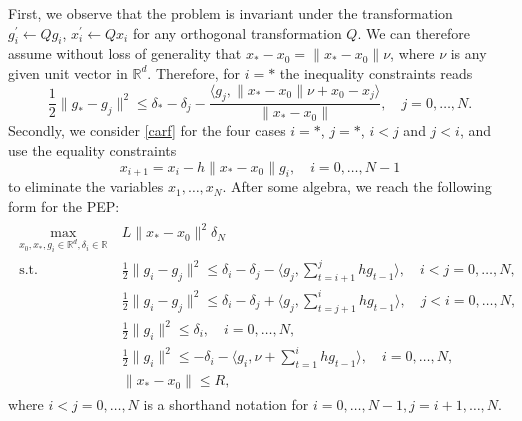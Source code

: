 \documentclass[12pt]{article}
\numberwithin{equation}{section}
\theoremstyle{definition}
\theoremstyle{remark}
\begin{document}
First, we observe that the problem is invariant under the transformation $g_i^\prime
\leftarrow Q g_i$, $x_i^\prime \leftarrow Q x_i$ for any orthogonal transformation $Q$. We can
therefore assume without loss of generality that $x_\ast- x_0= \|x_\ast-x_0\|\nu$, where $\nu$
is any given unit vector in $\mathbb{R}^d$. Therefore, for $i=\ast$ the inequality constraints
reads
\[
    \frac{1}{2}\| g_\ast - g_j \| ^2 \leq \delta_\ast - \delta_j - \frac{ \langle g_j, \|x_\ast-x_0\|\nu+x_0-x_j \rangle}{\|x_\ast-x_0\|},\quad     j=0,\dots,N.
\]
Secondly,
we consider \eqref{carf} for the four cases $i=\ast$, $j=\ast$, $i<j$ and $j<i$,
and use the equality constraints
$$
x_{i+1} = x_i - h \|x_\ast-x_0\| g_i,\quad i=0,\dots,N-1
$$
to eliminate the variables $x_1,\dots,x_N$.
After some algebra, we reach the following form for the PEP:
\begin{align*}
    \begin{aligned}
    \max_{x_0,x_\ast,g_i \in\mathbb{R}^d,\delta_i \in\mathbb{R}}\ & L\|x_\ast-x_0\|^2 \delta_N \\
    \text{s.t. }
                        & \frac{1}{2} \| g_i - g_j \| ^2 \leq \delta_i - \delta_j - \langle g_j, \sum_{t=i+1}^{j} h g_{t-1} \rangle,\quad i<j=0,\dots,N, \\
                        & \frac{1}{2} \| g_i - g_j \| ^2 \leq \delta_i - \delta_j + \langle g_j, \sum_{t=j+1}^{i} h g_{t-1} \rangle,\quad j<i=0,\dots,N, \\
                        & \frac{1}{2} \| g_i \| ^2 \leq \delta_i,\quad                                                                                          i=0,\dots,N, \\
                        & \frac{1}{2} \| g_i \| ^2 \leq - \delta_i - \langle g_i, \nu + \sum_{t=1}^{i} h g_{t-1} \rangle,\quad  i=0,\dots,N, \\
                        & \|x_\ast-x_0\| \leq R,
    \end{aligned}
\end{align*}
where $i<j=0,\dots,N$ is a shorthand notation  for $i=0,\dots,N-1, j= i+1,\dots, N$.
\end{document}
